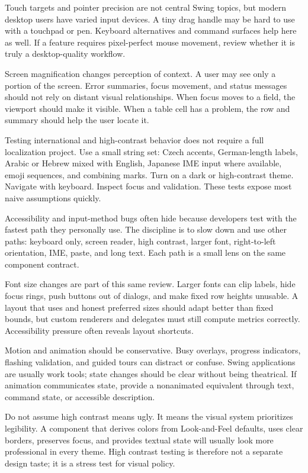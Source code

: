 Touch targets and pointer precision are not central Swing topics, but modern desktop users have varied input devices. A tiny drag handle may be hard to use with a touchpad or pen. Keyboard alternatives and command surfaces help here as well. If a feature requires pixel-perfect mouse movement, review whether it is truly a desktop-quality workflow.

Screen magnification changes perception of context. A user may see only a portion of the screen. Error summaries, focus movement, and status messages should not rely on distant visual relationships. When focus moves to a field, the viewport should make it visible. When a table cell has a problem, the row and summary should help the user locate it.

Testing international and high-contrast behavior does not require a full localization project. Use a small string set: Czech accents, German-length labels, Arabic or Hebrew mixed with English, Japanese IME input where available, emoji sequences, and combining marks. Turn on a dark or high-contrast theme. Navigate with keyboard. Inspect focus and validation. These tests expose most naive assumptions quickly.

Accessibility and input-method bugs often hide because developers test with the fastest path they personally use. The discipline is to slow down and use other paths: keyboard only, screen reader, high contrast, larger font, right-to-left orientation, IME, paste, and long text. Each path is a small lens on the same component contract.

Font size changes are part of this same review. Larger fonts can clip labels, hide focus rings, push buttons out of dialogs, and make fixed row heights unusable. A layout that uses \miglayout{} and honest preferred sizes should adapt better than fixed bounds, but custom renderers and delegates must still compute metrics correctly. Accessibility pressure often reveals layout shortcuts.

Motion and animation should be conservative. Busy overlays, progress indicators, flashing validation, and guided tours can distract or confuse. Swing applications are usually work tools; state changes should be clear without being theatrical. If animation communicates state, provide a nonanimated equivalent through text, command state, or accessible description.

Do not assume high contrast means ugly. It means the visual system prioritizes legibility. A component that derives colors from Look-and-Feel defaults, uses clear borders, preserves focus, and provides textual state will usually look more professional in every theme. High contrast testing is therefore not a separate design taste; it is a stress test for visual policy.

